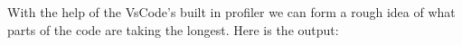 With the help of the VsCode's built in profiler we can form a rough idea of what parts of the code
are taking the longest. Here is the output:
